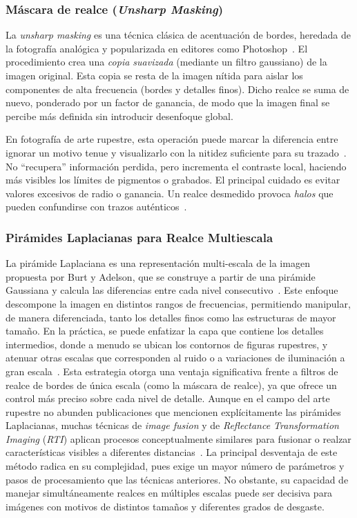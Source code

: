 \subsubsection{Máscara de realce (\textit{Unsharp Masking})}

La \textit{unsharp masking} es una técnica clásica de acentuación de bordes, heredada de la fotografía analógica y popularizada en editores como Photoshop~\cite{adobe_unsharp_masking}.
El procedimiento crea una \emph{copia suavizada} (mediante un filtro gaussiano) de la imagen original.
Esta copia se resta de la imagen nítida para aislar los componentes de alta frecuencia (bordes y detalles finos).
Dicho realce se suma de nuevo, ponderado por un factor de ganancia, de modo que la imagen final se percibe más definida sin introducir desenfoque global.

En fotografía de arte rupestre, esta operación puede marcar la diferencia entre ignorar un motivo tenue y visualizarlo con la nitidez suficiente para su trazado~\cite{xiao2020}.
No “recupera” información perdida, pero incrementa el contraste local, haciendo más visibles los límites de pigmentos o grabados.
El principal cuidado es evitar valores excesivos de radio o ganancia.
Un realce desmedido provoca \emph{halos} que pueden confundirse con trazos auténticos~\cite{adobe_unsharp_masking}.


\subsubsection{Pirámides Laplacianas para Realce Multiescala}

La pirámide Laplaciana es una representación multi-escala de la imagen propuesta por Burt y Adelson, que se construye a partir de una pirámide Gaussiana y calcula las diferencias entre cada nivel consecutivo~\cite{bai2023,zhou2019}.
Este enfoque descompone la imagen en distintos rangos de frecuencias, permitiendo manipular, de manera diferenciada, tanto los detalles finos como las estructuras de mayor tamaño.
En la práctica, se puede enfatizar la capa que contiene los detalles intermedios, donde a menudo se ubican los contornos de figuras rupestres, y atenuar otras escalas que corresponden al ruido o a variaciones de iluminación a gran escala~\cite{paris2008}.
Esta estrategia otorga una ventaja significativa frente a filtros de realce de bordes de única escala (como la máscara de realce), ya que ofrece un control más preciso sobre cada nivel de detalle.
Aunque en el campo del arte rupestre no abunden publicaciones que mencionen explícitamente las pirámides Laplacianas, muchas técnicas de \textit{image fusion} y de \textit{Reflectance Transformation Imaging} (\textit{RTI}) aplican procesos conceptualmente similares para fusionar o realzar características visibles a diferentes distancias~\cite{zhou2019}.
La principal desventaja de este método radica en su complejidad, pues exige un mayor número de parámetros y pasos de procesamiento que las técnicas anteriores.
No obstante, su capacidad de manejar simultáneamente realces en múltiples escalas puede ser decisiva para imágenes con motivos de distintos tamaños y diferentes grados de desgaste.

